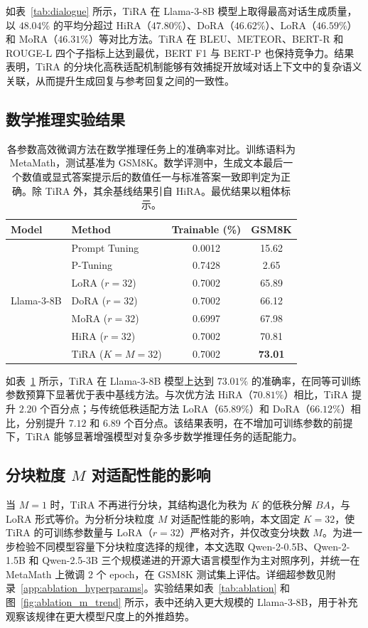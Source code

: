 \documentclass[UTF8,a4paper,11pt]{ctexart}
\begin{document}
如表~\ref{tab:dialogue} 所示，TiRA 在 Llama-3-8B 模型上取得最高对话生成质量，以 $48.04\%$ 的平均分超过 HiRA（$47.80\%$）、DoRA（$46.62\%$）、LoRA（$46.59\%$）和 MoRA（$46.31\%$）等对比方法。TiRA 在 BLEU、METEOR、BERT-R 和 ROUGE-L 四个子指标上达到最优，BERT F1 与 BERT-P 也保持竞争力。结果表明，TiRA 的分块化高秩适配机制能够有效捕捉开放域对话上下文中的复杂语义关联，从而提升生成回复与参考回复之间的一致性。

\subsection{数学推理实验结果}

\begin{table}[H]
\centering
\caption{各参数高效微调方法在数学推理任务上的准确率对比。训练语料为 MetaMath，测试基准为 GSM8K。数学评测中，生成文本最后一个数值或显式答案提示后的数值任一与标准答案一致即判定为正确。除 TiRA 外，其余基线结果引自 HiRA。最优结果以粗体标示。}
\label{tab:math}
\begin{tabular}{llcc}
\toprule
Model & Method & Trainable (\%) & GSM8K \\
\midrule
\multirow{7}{*}{Llama-3-8B}
& Prompt Tuning & 0.0012 & 15.62 \\
& P-Tuning & 0.7428 & 2.65 \\
& LoRA ($r=32$) & 0.7002 & 65.89 \\
& DoRA ($r=32$) & 0.7002 & 66.12 \\
& MoRA ($r=32$) & 0.6997 & 67.98 \\
& HiRA ($r=32$) & 0.7002 & 70.81 \\
& TiRA ($K=M=32$) & 0.7002 & \textbf{73.01} \\
\bottomrule
\end{tabular}
\end{table}

如表~\ref{tab:math} 所示，TiRA 在 Llama-3-8B 模型上达到 $73.01\%$ 的准确率，在同等可训练参数预算下显著优于表中基线方法。与次优方法 HiRA（$70.81\%$）相比，TiRA 提升 $2.20$ 个百分点；与传统低秩适配方法 LoRA（$65.89\%$）和 DoRA（$66.12\%$）相比，分别提升 $7.12$ 和 $6.89$ 个百分点。该结果表明，在不增加可训练参数的前提下，TiRA 能够显著增强模型对复杂多步数学推理任务的适配能力。

\subsection{分块粒度 $M$ 对适配性能的影响}

当 $M=1$ 时，TiRA 不再进行分块，其结构退化为秩为 $K$ 的低秩分解 $BA$，与 LoRA 形式等价。为分析分块粒度 $M$ 对适配性能的影响，本文固定 $K=32$，使 TiRA 的可训练参数量与 LoRA（$r=32$）严格对齐，并仅改变分块数 $M$。为进一步检验不同模型容量下分块粒度选择的规律，本文选取 Qwen-2-0.5B、Qwen-2-1.5B 和 Qwen-2.5-3B\cite{yang2024qwen2,yang2024qwen25} 三个规模递进的开源大语言模型作为主对照序列，并统一在 MetaMath 上微调 2 个 epoch，在 GSM8K 测试集上评估。详细超参数见附录~\ref{app:ablation_hyperparams}。实验结果如表~\ref{tab:ablation} 和图~\ref{fig:ablation_m_trend} 所示，表中还纳入更大规模的 Llama-3-8B，用于补充观察该规律在更大模型尺度上的外推趋势。
\end{document}
